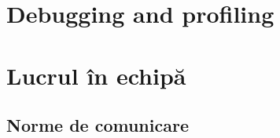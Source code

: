 
% 
% 
% 

\section{Debugging and profiling}

\section{Lucrul în echipă}
% 
% 
% 


\subsection{Norme de comunicare}

